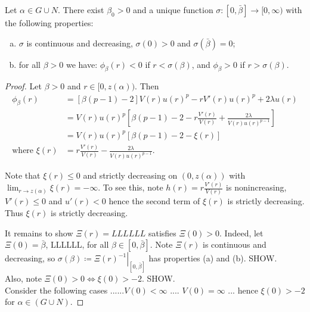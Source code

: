 \newpage
\begin{lemma}Let $\alpha\in G\cup N$. There exist $\beta_0>0$ and a unique function $\sigma:[0,\bar\beta]\to[0,\infty)$ with the following properties: \begin{enumerate}[(a)]
	\item  $\sigma$ is continuous and decreasing, $\sigma(0)>0$ and $\sigma(\bar\beta)=0$;
    \item for all $\beta>0$ we have: $\phi_\beta(r)<0$ if $r<\sigma(\beta)$, and $\phi_\beta>0$ if $r>\sigma(\beta)$.
\end{enumerate}
\begin{proof} 
Let $\beta>0$ and $r\in[0,z(\alpha))$. Then \begin{align*}
\phi_{\beta}(r)&=\left[\beta(p-1)-2\right]V(r)u(r)^p-rV'(r)u(r)^p+2\lambda u(r) %
\\ &=V(r)u(r)^p\left[\beta(p-1)-2-r\frac{V'(r)}{V(r)}+\frac{2\lambda}{V(r)u(r)^{p-1}}\right] 
\\ &= V(r)u(r)^p\left[\beta(p-1)-2-\xi(r)\right]
\\\text{where }\xi(r)&=r\frac{V'(r)}{V(r)}-\frac{2\lambda}{V(r)u(r)^{p-1}}.
\end{align*}

Note that $\xi(r)\leq0$ and strictly decreasing on $(0,z(\alpha))$ with $\lim_{r\to z(\alpha)}\xi(r)=-\infty$. To see this, note $h(r)=r\frac{V'(r)}{V(r)}$ is nonincreasing, $V'(r)\leq0$ and $u'(r)<0$ hence the second term of $\xi(r)$ is strictly decreasing. Thus $\xi(r)$ is strictly decreasing.

It remains to show $\Xi(r)=LLLLLL$ satisfies $\Xi(0)>0$. Indeed, let $\Xi(0)=\bar\beta$, LLLLLL, for all $\beta\in[0,\bar\beta]$. Note $\Xi(r)$ is continuous and decreasing, so $\sigma(\beta)\coloneqq\left.\Xi(r)^{-1}\right|_{[0,\bar\beta]}$ has properties (a) and (b). SHOW. \\

Also, note $\Xi(0)>0\iff\xi(0)>-2$. SHOW.\\

Consider the following cases ......$V(0)<\infty$ .... $V(0)=\infty$ ... hence $\xi(0)>-2$ for $\alpha\in(G\cup N)$.

\end{proof}
\end{lemma}